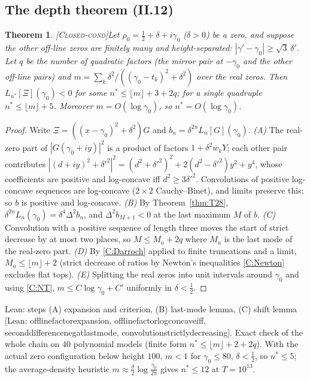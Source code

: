 \documentclass[11pt]{amsart}
\theoremstyle{plain}
\newtheorem{theorem}{Theorem}[section]
\theoremstyle{definition}
\newcommand{\status}[1]{\textsc{[#1]}}
\newcommand{\leanus}{\textunderscore\allowbreak}
\newcommand{\lean}[1]{{\ttfamily\let\_\leanus #1}}
\begin{document}
\subsection{The depth theorem (II.12)}
\begin{theorem}\status{Closed-cond}\label{thm:depth}
Let $\rho_0=\frac12+\delta+i\gamma_0$ ($\delta>0$) be a zero, and suppose the other
off-line zeros are finitely many and height-separated:
$|\gamma'-\gamma_0|\ge\sqrt3\,\delta'$. Let $q$ be the number of quadratic factors
(the mirror pair at $-\gamma_0$ and the other off-line pairs) and
$m=\sum_k\delta^2/((\gamma_0-t_k)^2+\delta^2)$ over the real zeros. Then
$L_{n^*}[\Xi](\gamma_0)<0$ for some $n^*\le\lfloor m\rfloor+3+2q$; for a single
quadruple $n^*\le\lfloor m\rfloor+5$. Moreover $m=O(\log\gamma_0)$, so $n^*=O(\log\gamma_0)$.
\end{theorem}
\begin{proof}
Write $\Xi=((x-\gamma_0)^2+\delta^2)G$ and $b_n=\delta^{2n}L_n[G](\gamma_0)$.
\emph{(A)} The real-zero part of $|G(\gamma_0+iy)|^2$ is a product of factors
$1+\delta^2w_kY$; each other pair contributes
$|(d+iy)^2+\delta'^2|^2=(d^2+\delta'^2)^2+2(d^2-\delta'^2)y^2+y^4$, whose coefficients are
positive and log-concave iff $d^2\ge3\delta'^2$. Convolutions of positive log-concave
sequences are log-concave ($2\times2$ Cauchy--Binet), and limits preserve this; so
$b$ is positive and log-concave.
\emph{(B)} By Theorem~\ref{thm:T28}, $\delta^{2n}L_n(\gamma_0)=\delta^4\Delta^2b_n$, and
$\Delta^2b_{M+1}<0$ at the last maximum $M$ of $b$.
\emph{(C)} Convolution with a positive sequence of length three moves the start of
strict decrease by at most two places, so $M\le M_a+2q$ where $M_a$ is the last mode
of the real-zero part.
\emph{(D)} By \ref{C:Darroch} applied to finite truncations and a limit,
$M_a\le\lfloor m\rfloor+2$ (strict decrease of ratios by Newton's inequalities
\ref{C:Newton} excludes flat tops).
\emph{(E)} Splitting the real zeros into unit intervals around $\gamma_0$ and using
\ref{C:NT}, $m\le C\log\gamma_0+C'$ uniformly in $\delta<\frac12$.
\end{proof}
\noindent Lean: steps (A) expansion and criterion, (B) last-mode lemma, (C) shift lemma
\lean{[Lean: offline\_factor\_expansion, offline\_factor\_logconcave\_iff,
second\_difference\_neg\_at\_last\_mode, convolution\_strictly\_decreasing]}.
Exact check of the whole chain on 40 polynomial models (finite form
$n^*\le\lfloor m\rfloor+2+2q$). With the actual zero configuration below height $100$,
$m<1$ for $\gamma_0\le80$, $\delta<\frac12$, so $n^*\le5$; the average-density heuristic
$m\approx\frac\delta2\log\frac{\gamma_0}{2\pi}$ gives $n^*\le12$ at $T=10^{13}$.
\end{document}
